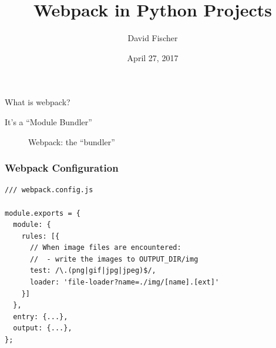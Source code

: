 \documentclass[handout]{beamer}
\title{Webpack in Python Projects}
\author{David Fischer}
\date{April 27, 2017}
\begin{document}
\maketitle


\begin{frame}
\frametitle{}
  {\huge What is webpack?}
\end{frame}


\begin{frame}
  It's a ``Module Bundler''
\end{frame}


\begin{frame}
  \begin{figure}[p]
    \centering
    \caption{Webpack: the ``bundler''}
  \end{figure}
\end{frame}



\begin{frame}[fragile]
\frametitle{Webpack Configuration}

{\scriptsize
\begin{verbatim}
/// webpack.config.js

module.exports = {
  module: {
    rules: [{
      // When image files are encountered:
      //  - write the images to OUTPUT_DIR/img
      test: /\.(png|gif|jpg|jpeg)$/,
      loader: 'file-loader?name=./img/[name].[ext]'
    }]
  },
  entry: {...},
  output: {...},
};
\end{verbatim}
}

\end{frame}
\end{document}
